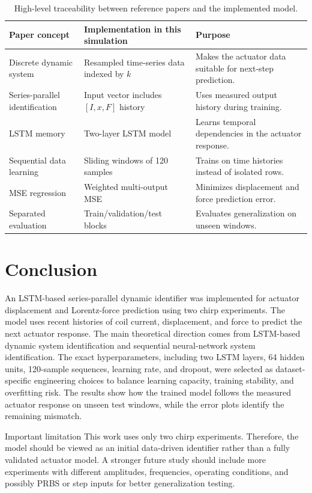 \documentclass[11pt]{article}
\begin{document}
\begin{table}[H]
\centering
\small
\begin{tabular}{p{4.1cm}p{4.6cm}p{5.8cm}}
\toprule
Paper concept & Implementation in this simulation & Purpose \\
\midrule
Discrete dynamic system \cite{wang2017} & Resampled time-series data indexed by $k$ & Makes the actuator data suitable for next-step prediction. \\
Series-parallel identification \cite{wang2017} & Input vector includes $[I,x,F]$ history & Uses measured output history during training. \\
LSTM memory \cite{wang2017} & Two-layer LSTM model & Learns temporal dependencies in the actuator response. \\
Sequential data learning \cite{ogunmolu2016} & Sliding windows of 120 samples & Trains on time histories instead of isolated rows. \\
MSE regression \cite{ogunmolu2016} & Weighted multi-output MSE & Minimizes displacement and force prediction error. \\
Separated evaluation \cite{ogunmolu2016} & Train/validation/test blocks & Evaluates generalization on unseen windows. \\
\bottomrule
\end{tabular}
\caption{High-level traceability between reference papers and the implemented model.}
\label{tab:traceability}
\end{table}

\section{Conclusion}
An LSTM-based series-parallel dynamic identifier was implemented for actuator displacement and Lorentz-force prediction using two chirp experiments. The model uses recent histories of coil current, displacement, and force to predict the next actuator response. The main theoretical direction comes from LSTM-based dynamic system identification and sequential neural-network system identification. The exact hyperparameters, including two LSTM layers, 64 hidden units, 120-sample sequences, learning rate, and dropout, were selected as dataset-specific engineering choices to balance learning capacity, training stability, and overfitting risk. The results show how the trained model follows the measured actuator response on unseen test windows, while the error plots identify the remaining mismatch.

\begin{cautionbox}{Important limitation}
This work uses only two chirp experiments. Therefore, the model should be viewed as an initial data-driven identifier rather than a fully validated actuator model. A stronger future study should include more experiments with different amplitudes, frequencies, operating conditions, and possibly PRBS or step inputs for better generalization testing.
\end{cautionbox}
\end{document}
